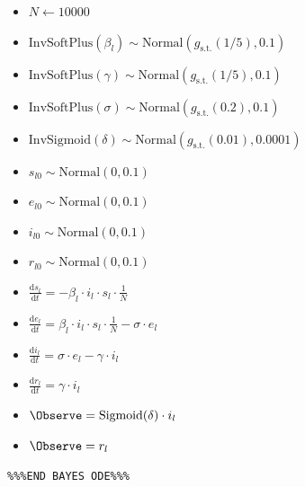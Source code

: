 \documentclass[11pt,letterpaper]{article}
\theoremstyle{plain}
\newcommand{\Sigmoid}{\textrm{Sigmoid}}
\newcommand{\InvSoftPlus}{\textrm{InvSoftPlus}}
\newcommand{\InvSigmoid}{\textrm{InvSigmoid}}
\newcommand{\Dist}[1]{\textrm{#1}}
\newcommand{\Evolve}[1]{\frac{\textrm{d}#1}{\textrm{d}t}}
\newcommand{\gst}{g_{\textrm{s.t.}}}
\begin{document}
{%
\begin{itemize}
\item $N \leftarrow 10000$  %
\item $\InvSoftPlus(\beta_{l}) \sim \Dist{Normal}(\gst(1/5),0.1)$
\item $\InvSoftPlus(\gamma) \sim \Dist{Normal}(\gst(1/5),0.1)$
\item $\InvSoftPlus(\sigma) \sim \Dist{Normal}(\gst(0.2),0.1)$
\item $\InvSigmoid(\delta) \sim \Dist{Normal}(\gst(0.01),0.0001)$ %
\item $s_{l0} \sim \Dist{Normal}(0, 0.1)$ %
\item $e_{l0} \sim \Dist{Normal}(0, 0.1)$ %
\item $i_{l0}\sim \Dist{Normal}(0, 0.1)$ %
\item $r_{l0} \sim \Dist{Normal}(0, 0.1)$  %
\item $\Evolve{s_l} = -\beta_{l} \cdot i_l \cdot s_l \cdot \frac{1}{N}$
\item $\Evolve{e_l} = \beta_{l} \cdot  i_l \cdot  s_l \cdot \frac{1}{N} - \sigma \cdot  e_l$
\item $\Evolve{i_l} = \sigma \cdot e_l - \gamma \cdot  i_l$
\item $\Evolve{r_l} = \gamma \cdot  i_l$
\item $\Observe = \Sigmoid( \delta ) \cdot i_l$ %
\item $\Observe = r_l$ %
\end{itemize}


\Verb|%%%END BAYES ODE%%%|

}
\end{document}
